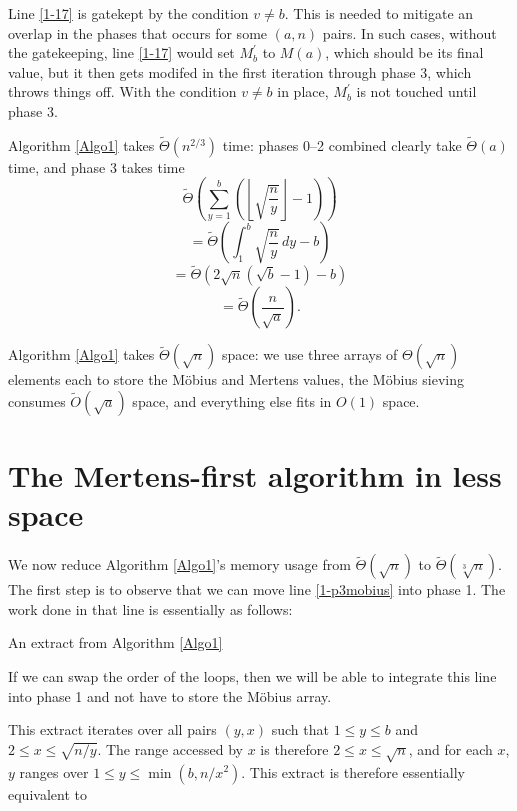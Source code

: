 \documentclass[12pt]{article}
\newcommand{\eqn}[1]{\begin{displaymath} #1 \end{displaymath}}
\newcommand{\floor}[1]{{\left\lfloor #1 \right\rfloor}}
\newcommand{\integral}[4]{\displaystyle\int_{#3}^{#4} \! #1 \, d#2}
\newcommand{\eval}[3]{\left. #1 \right|_{#2}^{#3}}
\newcommand{\dfloordiv}[2]{\floor{\dfrac{#1}{#2}}}
\newcommand{\isqrt}[1]{\floor{\sqrt{#1}}}
\newcommand{\softO}[0]{\widetilde{O}}
\newcommand{\softTheta}[0]{\widetilde{\Theta}}
\begin{document}
Line \ref{1-17} is gatekept by the condition $v \neq b$.  This is needed to mitigate an overlap in the phases that occurs for some $(a,n)$ pairs.  In such cases, without the gatekeeping, line \ref{1-17} would set $M^\prime_b$ to $M(a)$, which should be its final value, but it then gets modifed in the first iteration through phase 3, which throws things off.  With the condition $v \neq b$ in place, $M^\prime_b$ is not touched until phase 3.

Algorithm \ref{Algo1} takes $\softTheta(n^{2/3})$ time: phases 0--2 combined clearly take $\softTheta(a)$ time, and phase 3 takes time
\eqn{\softTheta \left( \sum_{y=1}^b \left( \isqrt{\frac{n}{y}} - 1 \right) \right)}
\eqn{= \softTheta \left( \integral{ \sqrt{\frac{n}{y}} }{y}{1}{b} - b \right)}
\eqn{= \softTheta \left( 2 \sqrt{n} \left( \sqrt{b} - 1 \right) - b \right)}
\eqn{= \softTheta \left( \frac{n}{\sqrt{a}} \right).}

Algorithm \ref{Algo1} takes $\softTheta(\sqrt{n})$ space: we use three arrays of $\Theta(\sqrt{n})$ elements each to store the M\"{o}bius and Mertens values, the M\"{o}bius sieving consumes $\softO(\sqrt{a})$ space, and everything else fits in $O(1)$ space.

\section{The Mertens-first algorithm in less space}

We now reduce Algorithm \ref{Algo1}'s memory usage from $\softTheta(\sqrt{n})$ to $\softTheta(\sqrt[3]{n})$.  The first step is to observe that we can move line \ref{1-p3mobius} into phase 1.  The work done in that line is essentially as follows:

\begin{algorithm}[H] \label{Algo1mu}
\DontPrintSemicolon
\caption{An extract from Algorithm \ref{Algo1}}
\For{$y=b$ \KwTo $1$}{
    \For{$x=2$ \KwTo $\isqrt{n/y}$}{
        $M^\prime_y \gets M^\prime_y - \mu_x \cdot \dfloordiv{n}{yx}$
    }
}
\end{algorithm}

If we can swap the order of the loops, then we will be able to integrate this line into phase 1 and not have to store the M\"{o}bius array.

This extract iterates over all pairs $(y,x)$ such that $1 \leq y \leq b$ and $2 \leq x \leq \sqrt{n/y}$.  The range accessed by $x$ is therefore $2 \leq x \leq \sqrt{n}$, and for each $x$, $y$ ranges over $1 \leq y \leq \min(b, n/x^2)$.  This extract is therefore essentially equivalent to
\end{document}
